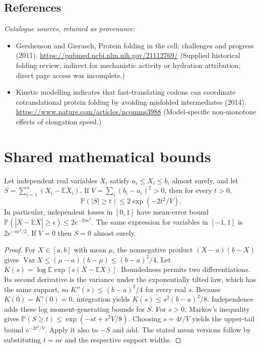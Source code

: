 \documentclass[11pt]{article}
\begin{document}
\subsection{References}
\noindent\emph{Catalogue sources, retained as provenance:}
\begin{itemize}
\item Gershenson and Gierasch, Protein folding in the cell: challenges and progress (2011). \url{https://pubmed.ncbi.nlm.nih.gov/21112769/} (Supplied historical folding review; indirect for mechanistic activity or hydration attribution; direct page access was incomplete.)
\item Kinetic modelling indicates that fast-translating codons can coordinate cotranslational protein folding by avoiding misfolded intermediates (2014). \url{https://www.nature.com/articles/ncomms3988} (Model-specific non-monotone effects of elongation speed.)
\end{itemize}




\section{Shared mathematical bounds}\label{app:bounds}
\begin{lemma}\label{lem:bounded}
Let independent real variables $X_i$ satisfy $a_i\leq X_i\leq b_i$ almost surely,
and let $S=\sum_{i=1}^n(X_i-\mathbb{E} X_i)$. If
$V=\sum_i(b_i-a_i)^2>0$, then for every $t>0$,
\[
 \mathbb{P}(|S|\geq t)\leq 2\exp(-2t^2/V).
\]
In particular, independent losses in $[0,1]$ have mean-error bound
$\mathbb{P}(|\overline X-\mathbb{E}\overline X|\geq\epsilon)
\leq2e^{-2n\epsilon^2}$. The same expression for variables in $[-1,1]$
is $2e^{-n\epsilon^2/2}$. If $V=0$ then $S=0$ almost surely.
\end{lemma}
\begin{proof}
For $X\in[a,b]$ with mean $\mu$, the nonnegative product
$(X-a)(b-X)$ gives
$\operatorname{Var} X\leq(\mu-a)(b-\mu)\leq(b-a)^2/4$.
Let $K(s)=\log\mathbb{E}\exp[s(X-\mathbb{E} X)]$.
Boundedness permits two differentiations. Its second derivative is the variance
under the exponentially tilted law, which has the same support, so
$K''(s)\leq(b-a)^2/4$ for every real $s$.
Because $K(0)=K'(0)=0$, integration yields
$K(s)\leq s^2(b-a)^2/8$.
Independence adds these log moment-generating bounds for $S$.
For $s>0$, Markov's inequality gives
$\mathbb{P}(S\geq t)\leq\exp(-st+s^2V/8)$.
Choosing $s=4t/V$ yields the upper-tail bound $e^{-2t^2/V}$.
Apply it also to $-S$ and add. The stated mean versions follow by substituting
$t=n\epsilon$ and the respective support widths.
\end{proof}
\end{document}
